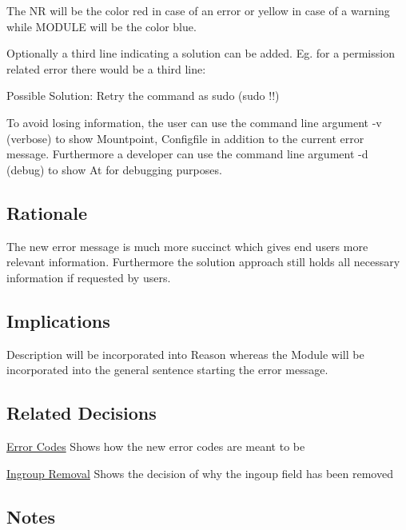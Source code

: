 The {\ttfamily NR} will be the color red in case of an error or yellow in case of a warning while {\ttfamily M\+O\+D\+U\+LE} will be the color blue.

Optionally a third line indicating a solution can be added. Eg. for a permission related error there would be a third line\+:


\begin{DoxyCode}
Possible Solution: Retry the command as sudo (sudo !!)
\end{DoxyCode}


To avoid losing information, the user can use the command line argument {\ttfamily -\/v} (verbose) to show {\ttfamily Mountpoint}, {\ttfamily Configfile} in addition to the current error message. Furthermore a developer can use the command line argument {\ttfamily -\/d} (debug) to show {\ttfamily At} for debugging purposes.

\subsection*{Rationale}

The new error message is much more succinct which gives end users more relevant information. Furthermore the solution approach still holds all necessary information if requested by users.

\subsection*{Implications}

{\ttfamily Description} will be incorporated into {\ttfamily Reason} whereas the {\ttfamily Module} will be incorporated into the general sentence starting the error message.

\subsection*{Related Decisions}


\begin{DoxyItemize}
\item \hyperlink{doc_decisions_error_codes_md}{Error Codes} Shows how the new error codes are meant to be
\item \hyperlink{doc_decisions_ingroup_removal_md}{Ingroup Removal} Shows the decision of why the {\ttfamily ingoup} field has been removed
\end{DoxyItemize}

\subsection*{Notes}
